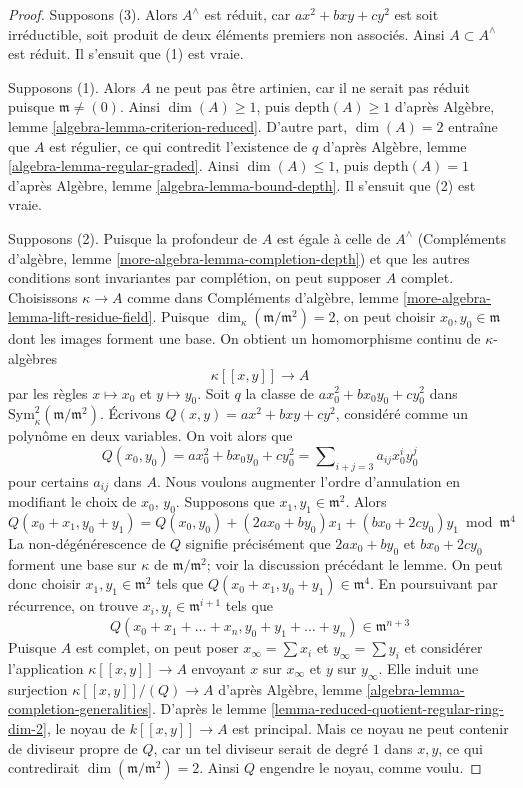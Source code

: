\begin{proof}
Supposons (3). Alors $A^\wedge$ est réduit, car $ax^2 + bxy + cy^2$ est soit irréductible, soit produit de deux éléments premiers non associés. Ainsi $A \subset A^\wedge$ est réduit. Il s'ensuit que (1) est vraie.

\medskip\noindent
Supposons (1). Alors $A$ ne peut pas être artinien, car il ne serait pas réduit puisque $\mathfrak m \not = (0)$. Ainsi $\dim(A) \geq 1$, puis $\text{depth}(A) \geq 1$ d'après Algèbre, lemme \ref{algebra-lemma-criterion-reduced}. D'autre part, $\dim(A) = 2$ entraîne que $A$ est régulier, ce qui contredit l'existence de $q$ d'après Algèbre, lemme \ref{algebra-lemma-regular-graded}. Ainsi $\dim(A) \leq 1$, puis $\text{depth}(A) = 1$ d'après Algèbre, lemme \ref{algebra-lemma-bound-depth}. Il s'ensuit que (2) est vraie.

\medskip\noindent
Supposons (2). Puisque la profondeur de $A$ est égale à celle de $A^\wedge$ (Compléments d'algèbre, lemme \ref{more-algebra-lemma-completion-depth}) et que les autres conditions sont invariantes par complétion, on peut supposer $A$ complet. Choisissons $\kappa \to A$ comme dans Compléments d'algèbre, lemme \ref{more-algebra-lemma-lift-residue-field}. Puisque $\dim_\kappa(\mathfrak m/\mathfrak m^2) = 2$, on peut choisir $x_0, y_0 \in \mathfrak m$ dont les images forment une base. On obtient un homomorphisme continu de $\kappa$-algèbres $$
\kappa[[x, y]] \longrightarrow A
$$ par les règles $x \mapsto x_0$ et $y \mapsto y_0$. Soit $q$ la classe de $ax_0^2 + bx_0y_0 + cy_0^2$ dans $\text{Sym}^2_\kappa(\mathfrak m/\mathfrak m^2)$. Écrivons $Q(x, y) = ax^2 + bxy + cy^2$, considéré comme un polynôme en deux variables. On voit alors que $$
Q(x_0, y_0) = ax_0^2 + bx_0y_0 + cy_0^2 =
\sum\nolimits_{i + j = 3} a_{ij} x_0^iy_0^j
$$ pour certains $a_{ij}$ dans $A$. Nous voulons augmenter l'ordre d'annulation en modifiant le choix de $x_0$, $y_0$. Supposons que $x_1, y_1 \in \mathfrak m^2$. Alors $$
Q(x_0 + x_1, y_0 + y_1) = Q(x_0, y_0) +
(2ax_0 + by_0)x_1 + (bx_0 + 2cy_0)y_1 \bmod \mathfrak m^4
$$ La non-dégénérescence de $Q$ signifie précisément que $2ax_0 + by_0$ et $bx_0 + 2cy_0$ forment une base sur $\kappa$ de $\mathfrak m/\mathfrak m^2$; voir la discussion précédant le lemme. On peut donc choisir $x_1, y_1 \in \mathfrak m^2$ tels que $Q(x_0 + x_1, y_0 + y_1) \in \mathfrak m^4$. En poursuivant par récurrence, on trouve $x_i, y_i \in \mathfrak m^{i + 1}$ tels que $$
Q(x_0 + x_1 + \ldots + x_n, y_0 + y_1 + \ldots + y_n) \in \mathfrak m^{n + 3}
$$ Puisque $A$ est complet, on peut poser $x_\infty = \sum x_i$ et $y_\infty = \sum y_i$ et considérer l'application $\kappa[[x, y]] \longrightarrow A$ envoyant $x$ sur $x_\infty$ et $y$ sur $y_\infty$. Elle induit une surjection $\kappa[[x, y]]/(Q) \longrightarrow A$ d'après Algèbre, lemme \ref{algebra-lemma-completion-generalities}. D'après le lemme \ref{lemma-reduced-quotient-regular-ring-dim-2}, le noyau de $k[[x, y]] \to A$ est principal. Mais ce noyau ne peut contenir de diviseur propre de $Q$, car un tel diviseur serait de degré $1$ dans $x, y$, ce qui contredirait $\dim(\mathfrak m/\mathfrak m^2) = 2$. Ainsi $Q$ engendre le noyau, comme voulu.
\end{proof}

